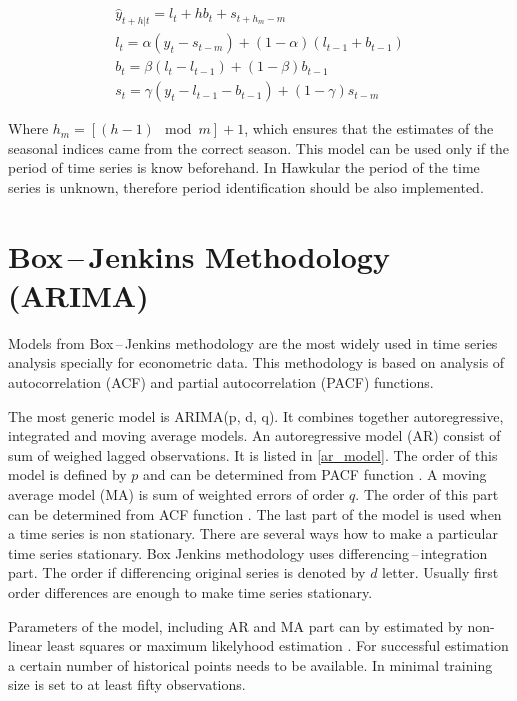     \begin{eqnarray} \label{exp_holt_winters}
        \hat{y}_{t+h|t} = l_{t} + hb_{t} + s_{t+h_m-m}\\ \nonumber
        l_t = \alpha (y_t - s_{t-m}) + (1 - \alpha) (l_{t-1} + b_{t-1}) \\ \nonumber
        b_t = \beta (l_t - l_{t-1}) + (1 - \beta)b_{t-1} \\ \nonumber
        s_t = \gamma (y_t - l_{t-1} - b_{t-1}) + (1-\gamma)s_{t-m}
    \end{eqnarray}

    Where $h_m=[(h-1) \mod m] + 1$, which ensures that the estimates of the seasonal
    indices came from the correct season. This model can be used only if the period 
    of time series is know beforehand. In Hawkular the period of the time series is 
    unknown, therefore period identification should be also implemented.
    
    \section{Box\,--\,Jenkins Methodology (ARIMA)}
    Models from Box\,--\,Jenkins methodology are the most widely used in time series
    analysis specially for econometric data. This methodology is based on analysis of autocorrelation (ACF)
    and partial autocorrelation (PACF) functions.
    
    The most generic model is ARIMA(p, d, q). It combines together autoregressive, integrated and
    moving average models. An autoregressive model (AR) consist of sum of weighed lagged observations. It is listed
    in \ref{ar_model}. The order of this model is defined by $p$ and can be determined from PACF function \cite{cipra}.
    A moving average model (MA) is sum of weighted errors of order $q$. The order of this part can be
    determined from ACF function \cite{cipra}. The last part of the model is used when a time series is non stationary.
    There are several ways how to make a  particular time series stationary. Box Jenkins methodology uses
    differencing\,--\,integration part. The order if differencing original series is denoted by $d$ letter. Usually
    first order differences are enough to make time series stationary.

    Parameters of the model, including AR and MA part can by estimated by non-linear
    least squares or maximum likelyhood estimation \cite{brockwell}. For successful estimation a certain number of
    historical points needs to be available. In \cite{cipra} minimal training size is set to at least fifty
    observations.

